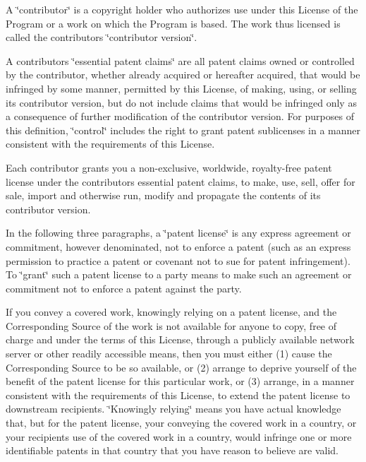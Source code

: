 A \char`\"{}contributor\char`\"{} is a copyright holder who authorizes use under this License of the Program or a work on which the Program is based. The work thus licensed is called the contributor\textquotesingle{}s \char`\"{}contributor version\char`\"{}.

A contributor\textquotesingle{}s \char`\"{}essential patent claims\char`\"{} are all patent claims owned or controlled by the contributor, whether already acquired or hereafter acquired, that would be infringed by some manner, permitted by this License, of making, using, or selling its contributor version, but do not include claims that would be infringed only as a consequence of further modification of the contributor version. For purposes of this definition, \char`\"{}control\char`\"{} includes the right to grant patent sublicenses in a manner consistent with the requirements of this License.

Each contributor grants you a non-\/exclusive, worldwide, royalty-\/free patent license under the contributor\textquotesingle{}s essential patent claims, to make, use, sell, offer for sale, import and otherwise run, modify and propagate the contents of its contributor version.

In the following three paragraphs, a \char`\"{}patent license\char`\"{} is any express agreement or commitment, however denominated, not to enforce a patent (such as an express permission to practice a patent or covenant not to sue for patent infringement). To \char`\"{}grant\char`\"{} such a patent license to a party means to make such an agreement or commitment not to enforce a patent against the party.

If you convey a covered work, knowingly relying on a patent license, and the Corresponding Source of the work is not available for anyone to copy, free of charge and under the terms of this License, through a publicly available network server or other readily accessible means, then you must either (1) cause the Corresponding Source to be so available, or (2) arrange to deprive yourself of the benefit of the patent license for this particular work, or (3) arrange, in a manner consistent with the requirements of this License, to extend the patent license to downstream recipients. \char`\"{}\+Knowingly relying\char`\"{} means you have actual knowledge that, but for the patent license, your conveying the covered work in a country, or your recipient\textquotesingle{}s use of the covered work in a country, would infringe one or more identifiable patents in that country that you have reason to believe are valid.

